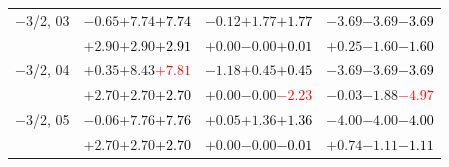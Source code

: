 \documentclass[compress]{beamer}
\begin{document}
\begin{frame}
\begin{tabular}{r | c | c | c}
$-$3/2, 03 & $-0.65$\hspace{0.1 cm}$+7.74$\hspace{0.1 cm}\textcolor{black}{$+7.74$} & $-0.12$\hspace{0.1 cm}$+1.77$\hspace{0.1 cm}\textcolor{black}{$+1.77$} & $-3.69$\hspace{0.1 cm}$-3.69$\hspace{0.1 cm}\textcolor{black}{$-3.69$} \\
           & $+2.90$\hspace{0.1 cm}$+2.90$\hspace{0.1 cm}\textcolor{black}{$+2.91$} & $+0.00$\hspace{0.1 cm}$-0.00$\hspace{0.1 cm}\textcolor{black}{$+0.01$} & $+0.25$\hspace{0.1 cm}$-1.60$\hspace{0.1 cm}\textcolor{black}{$-1.60$} \\
$-$3/2, 04 & $+0.35$\hspace{0.1 cm}$+8.43$\hspace{0.1 cm}\textcolor{red}{$+7.81$} & $-1.18$\hspace{0.1 cm}$+0.45$\hspace{0.1 cm}\textcolor{black}{$+0.45$} & $-3.69$\hspace{0.1 cm}$-3.69$\hspace{0.1 cm}\textcolor{black}{$-3.69$} \\
           & $+2.70$\hspace{0.1 cm}$+2.70$\hspace{0.1 cm}\textcolor{black}{$+2.70$} & $+0.00$\hspace{0.1 cm}$-0.00$\hspace{0.1 cm}\textcolor{red}{$-2.23$} & $-0.03$\hspace{0.1 cm}$-1.88$\hspace{0.1 cm}\textcolor{red}{$-4.97$} \\
$-$3/2, 05 & $-0.06$\hspace{0.1 cm}$+7.76$\hspace{0.1 cm}\textcolor{black}{$+7.76$} & $+0.05$\hspace{0.1 cm}$+1.36$\hspace{0.1 cm}\textcolor{black}{$+1.36$} & $-4.00$\hspace{0.1 cm}$-4.00$\hspace{0.1 cm}\textcolor{black}{$-4.00$} \\
           & $+2.70$\hspace{0.1 cm}$+2.70$\hspace{0.1 cm}\textcolor{black}{$+2.70$} & $+0.00$\hspace{0.1 cm}$-0.00$\hspace{0.1 cm}\textcolor{black}{$-0.01$} & $+0.74$\hspace{0.1 cm}$-1.11$\hspace{0.1 cm}\textcolor{black}{$-1.11$} \\

\end{tabular}
\end{frame}
\end{document}
